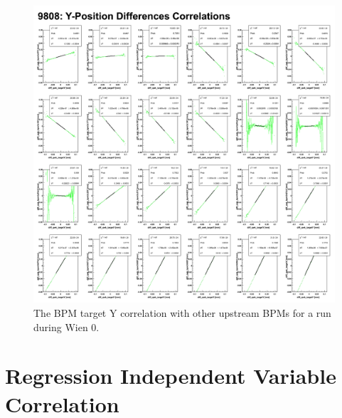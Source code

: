 \begin{singlespace}
\begin{figure}[!h]
	\begin{center}
	\includegraphics[width=15.0cm]{figures/YtgtCorrelation9808}
	\end{center}
	\caption
	{The BPM target Y correlation with other upstream BPMs for a run during Wien 0.}
	\label{fig:XtgtCorrelation9808}
\end{figure}
\end{singlespace}



\section{Regression Independent Variable Correlation}
\label{Relative Weighted Yield Stability for Q-weak}


